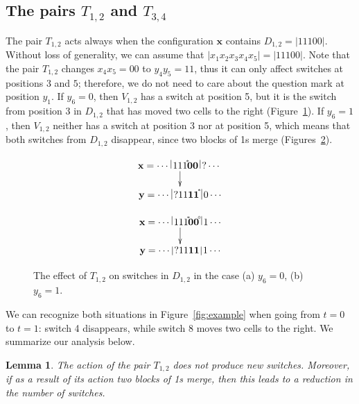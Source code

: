 \documentclass{sn-jnl}
\newtheorem{lem}{Lemma}%
\newcommand{\lllp}{\vline}
\newcommand{\bx}{\mathbf{x}}
\newcommand{\by}{\mathbf{y}}
\newcommand{\gn}[1]{\!^{{}^{{#1}}}\!\!}
\begin{document}
\subsection{The pairs $T_{1,2}$ and $T_{3,4}$}
The pair $T_{1,2}$ acts always when the configuration $\bx$ contains $D_{1,2}=|11100|$. Without loss of generality, we can assume that $|x_1x_{2}x_{3}x_{4}x_{5}|=|11100|$. Note that the pair $T_{1,2}$ changes $x_{4}x_{5}=00$ to $y_{4}y_{5}=11$, thus it can only affect switches at positions $3$ and $5$; therefore, we do not need to care about the question mark at position $y_1$.
If $y_6=0$, then $V_{1,2}$ has a switch at position 5, but it is the switch from position 3 in $D_{1,2}$ that 
has moved two cells to the right (Figure~\ref{fig:t1t2(a)}). If $y_6=1$, then $V_{1,2}$ neither has a switch at position 3 nor at position 5, which means that both switches from $D_{1,2}$ disappear, since two blocks of 1s merge (Figures~\ref{fig:t1t2(b)}). 
\begin{figure}[h!]
    \centering
    \begin{subfigure}{0.45\textwidth}
{\scriptsize\[
\xymatrix@C=0.2cm@R=0.5cm{ 
\bx = \cdots \;\lllp 111\gn{*}\boldsymbol{00} \, \lllp\, ?\cdots\;\ar[d] \\
\by = \cdots \;\lllp\, ?11\boldsymbol{11}\gn{*} \;\lllp\, 0\cdots
}
\]}
    \caption{}
    \label{fig:t1t2(a)}
\end{subfigure}
\hfill
 \begin{subfigure}{0.45\textwidth}
{\scriptsize\[
\xymatrix@C=0.2cm@R=0.5cm{ 
\bx = \cdots \;\lllp  111\gn{*}\boldsymbol{00}\gn{\circ} \;\lllp\,1 \cdots\ar[d] \\
\by = \cdots \;\lllp \, ?11\boldsymbol{11} \,\lllp\, 1\cdots 
}
\]}
    \caption{}
    \label{fig:t1t2(b)}
\end{subfigure}
 \caption{The effect of $T_{1,2}$ on switches in $D_{1,2}$ in the case (a) $y_{6}=0$, (b) $y_{6}=1$.}
        \label{fig:t1t2}
\end{figure}

We can recognize both situations in Figure~\ref{fig:example} when going from $t=0$ to $t=1$: switch 4 disappears, while switch 8 moves two cells to the right. We summarize our analysis below.

\begin{lem}\label{lem:t1t2}
The action of the pair $T_{1,2}$ does not produce new switches. Moreover, if as a result of its action two blocks of 1s merge, then this leads to a reduction in the number of switches.
\end{lem}
\end{document}
